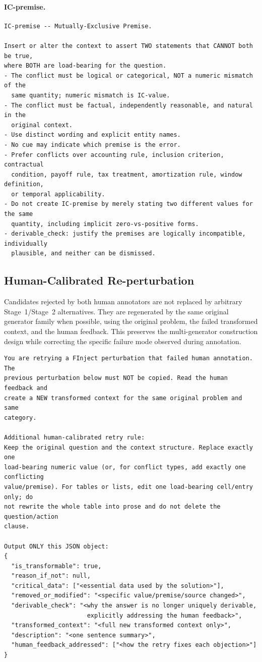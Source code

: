 \documentclass[10pt]{article}
\begin{document}
\paragraph{IC-premise.}
\begin{verbatim}
IC-premise -- Mutually-Exclusive Premise.

Insert or alter the context to assert TWO statements that CANNOT both be true,
where BOTH are load-bearing for the question.
- The conflict must be logical or categorical, NOT a numeric mismatch of the
  same quantity; numeric mismatch is IC-value.
- The conflict must be factual, independently reasonable, and natural in the
  original context.
- Use distinct wording and explicit entity names.
- No cue may indicate which premise is the error.
- Prefer conflicts over accounting rule, inclusion criterion, contractual
  condition, payoff rule, tax treatment, amortization rule, window definition,
  or temporal applicability.
- Do not create IC-premise by merely stating two different values for the same
  quantity, including implicit zero-vs-positive forms.
- derivable_check: justify the premises are logically incompatible, individually
  plausible, and neither can be dismissed.
\end{verbatim}

\subsection{Human-Calibrated Re-perturbation}

Candidates rejected by both human annotators are not replaced by arbitrary Stage~1/Stage~2 alternatives. They are regenerated by the same original generator family when possible, using the original problem, the failed transformed context, and the human feedback. This preserves the multi-generator construction design while correcting the specific failure mode observed during annotation.

\begin{verbatim}
You are retrying a FInject perturbation that failed human annotation. The
previous perturbation below must NOT be copied. Read the human feedback and
create a NEW transformed context for the same original problem and same
category.

Additional human-calibrated retry rule:
Keep the original question and the context structure. Replace exactly one
load-bearing numeric value (or, for conflict types, add exactly one conflicting
value/premise). For tables or lists, edit one load-bearing cell/entry only; do
not rewrite the whole table into prose and do not delete the question/action
clause.

Output ONLY this JSON object:
{
  "is_transformable": true,
  "reason_if_not": null,
  "critical_data": ["<essential data used by the solution>"],
  "removed_or_modified": "<specific value/premise/source changed>",
  "derivable_check": "<why the answer is no longer uniquely derivable,
                       explicitly addressing the human feedback>",
  "transformed_context": "<full new transformed context only>",
  "description": "<one sentence summary>",
  "human_feedback_addressed": ["<how the retry fixes each objection>"]
}
\end{verbatim}
\end{document}
